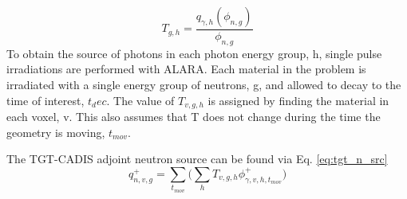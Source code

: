 \begin{equation}\label{eq:T}
	T_{g,h} = \dfrac{q_{\gamma, h}(\phi_{n,g})}{\phi_{n,g}}
\end{equation}
To obtain the source of photons in each photon energy group, h, 
single pulse irradiations are performed with ALARA.
Each material in the problem is irradiated with a single energy group of
neutrons, g, and allowed to decay to the time of interest, $t_dec$.  The value
of $T_{v,g,h}$ is assigned by finding the material in each voxel, v.
This also assumes that T does not change during the time the geometry is
moving, $t_{mov}$.  

The TGT-CADIS adjoint neutron source can be found via Eq.
\ref{eq:tgt_n_src}
\begin{equation}\label{eq:tgt_n_src}
	q_{n,v,g}^{+} =
	\sum_{t_{mov}}\Bigg(\sum_{h} T_{v,g,h} \phi_{\gamma,v,h,t_{mov}}^{+}\Bigg)
\end{equation}



